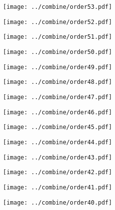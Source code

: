 \documentclass{article}
\begin{document}
\begin{figure}[H]
    \centering
    \texttt{[image: ../combine/order53.pdf]}
\end{figure}
\begin{figure}[H]
    \centering
    \texttt{[image: ../combine/order52.pdf]}
\end{figure}
\begin{figure}[H]
    \centering
    \texttt{[image: ../combine/order51.pdf]}
\end{figure}
\begin{figure}[H]
    \centering
    \texttt{[image: ../combine/order50.pdf]}
\end{figure}
\begin{figure}[H]
    \centering
    \texttt{[image: ../combine/order49.pdf]}
\end{figure}
\begin{figure}[H]
    \centering
    \texttt{[image: ../combine/order48.pdf]}
\end{figure}
\begin{figure}[H]
    \centering
    \texttt{[image: ../combine/order47.pdf]}
\end{figure}
\begin{figure}[H]
    \centering
    \texttt{[image: ../combine/order46.pdf]}
\end{figure}
\begin{figure}[H]
    \centering
    \texttt{[image: ../combine/order45.pdf]}
\end{figure}
\begin{figure}[H]
    \centering
    \texttt{[image: ../combine/order44.pdf]}
\end{figure}
\begin{figure}[H]
    \centering
    \texttt{[image: ../combine/order43.pdf]}
\end{figure}
\begin{figure}[H]
    \centering
    \texttt{[image: ../combine/order42.pdf]}
\end{figure}
\begin{figure}[H]
    \centering
    \texttt{[image: ../combine/order41.pdf]}
\end{figure}
\begin{figure}[H]
    \centering
    \texttt{[image: ../combine/order40.pdf]}
\end{figure}
\end{document}
